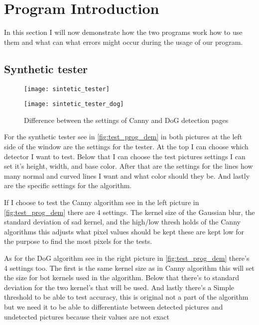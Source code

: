 \section{Program Introduction}

In this section I will now demonstrate how the two programs work how to use them and what can what errors might occur during the usage of our program.

\subsection{Synthetic tester}
\label{chap:tester}

\begin{figure}[H]
\centering
\begin{minipage}[t]{.49\textwidth}
\centering
\texttt{[image: sintetic\_tester]}
\end{minipage}
\begin{minipage}[t]{.49\textwidth}
\centering
\texttt{[image: sintetic\_tester\_dog]}
\end{minipage}
\caption{Difference between the settings of \ac{Canny} and \ac{DoG} detection pages}
\label{fig:test_prog_dem}
\end{figure}

For the synthetic tester see in \autoref{fig:test_prog_dem} in both pictures at the left side of the window are the settings for the tester. At the top I can choose which detector I want to test. Below that I can choose the test pictures settings I can set it's height, width, and base color. After that are the settings for the lines how many normal and curved lines I want and what color should they be. And lastly are the specific settings for the algorithm. 

If I choose to test the \ac{Canny} algorithm see in the left picture in \autoref{fig:test_prog_dem} there are 4 settings. The kernel size of the Gaussian blur, the standard deviation of sad kernel, and the high/low thresh holds of the \ac{Canny} algorithms this adjusts what pixel values should be kept these are kept low for the purpose to find the most pixels for the tests. 

As for the \ac{DoG} algorithm see in the right picture in \autoref{fig:test_prog_dem} there's 4 settings too. The first is the same kernel size as in \ac{Canny} algorithm this will set the size for bot kernels used in the algorithm. Below that there's to standard deviation for the two kernel's that will be used. And lastly there's a Simple threshold to be able to test accuracy, this is original not a part of the algorithm but we need it to be able to differentiate between detected pictures and undetected pictures because their values are not exact

